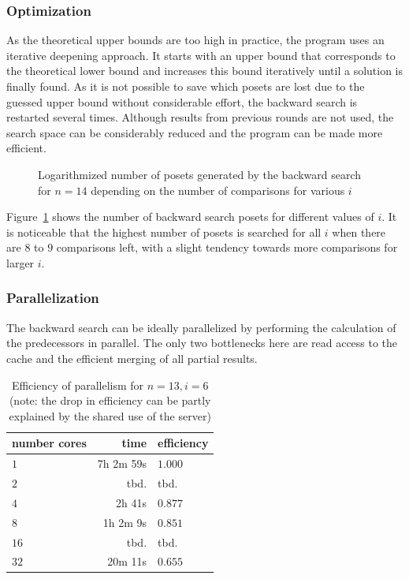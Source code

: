 \documentclass[10pt,journal,compsoc]{IEEEtran}
\begin{document}
\subsubsection{Optimization}

As the theoretical upper bounds are too high in practice, the program uses an iterative deepening approach.
It starts with an upper bound that corresponds to the theoretical lower bound and increases this bound iteratively until a solution is finally found.
As it is not possible to save which posets are lost due to the guessed upper bound without considerable effort, the backward search is restarted several times.
Although results from previous rounds are not used, the search space can be considerably reduced and the program can be made more efficient.

\begin{figure}
  \centering
  
  \caption{Logarithmized number of posets generated by the backward search for $n = 14$ depending on the number of comparisons for various $i$}
  \label{fig:backward-posets-per-level}
\end{figure}

Figure~\ref{fig:backward-posets-per-level} shows the number of backward search posets for different values of $i$.
It is noticeable that the highest number of posets is searched for all $i$ when there are $8$ to $9$ comparisons left, with a slight tendency towards more comparisons for larger $i$.


\subsubsection{Parallelization} \label{sec:backward:parallelisation}

The backward search can be ideally parallelized by performing the calculation of the predecessors in parallel.
The only two bottlenecks here are read access to the cache and the efficient merging of all partial results.

\begin{table}
  \begin{tabular}{l|r|l}
    number cores & time      & efficiency \\
    \hline
    $1$          & 7h 2m 59s & $1.000$    \\
    $2$          & tbd.      & tbd.       \\  %
    $4$          & 2h 41s    & $0.877$    \\
    $8$          & 1h 2m 9s  & $0.851$    \\
    $16$         & tbd.      & tbd.       \\ %
    $32$         & 20m 11s   & $0.655$    \\ %
  \end{tabular}
  \centering
  \caption{Efficiency of parallelism for $n = 13, i = 6$ (note: the drop in efficiency can be partly explained by the shared use of the server)}
  \label{table:backward-parallel}
\end{table}
\end{document}
